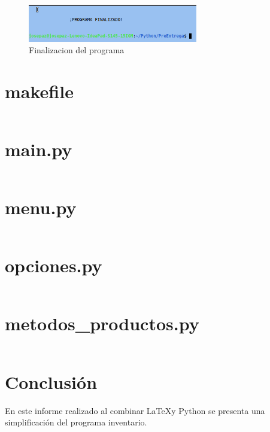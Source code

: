 \documentclass[12pt]{article}
\begin{document}
\begin{figure}[H]
	\centering
	\setlength{\fboxrule}{0pt}
	\includegraphics[width=0.66\textwidth]{img6.png}
	\caption{Finalizacion del programa}
	\label{fig:fin programa}
\end{figure} 

\section{makefile}
\inputminted[fontsize=\small]{make}{makefile}

\section{main.py}
\inputminted[fontsize=\small, breaklines=true]{python}{main.py}

\section{menu.py}
\inputminted[fontsize=\small, breaklines=true]{python}{menu.py}

\section{opciones.py}
\inputminted[fontsize=\small, breaklines=true]{python}{opciones.py}

\section{metodos\_productos.py}
\inputminted[fontsize=\small, breaklines=true]{python}{metodos_productos.py}

\section{Conclusión}

En este informe realizado al combinar \LaTeX y Python se presenta una simplificación del programa inventario.
\end{document}
